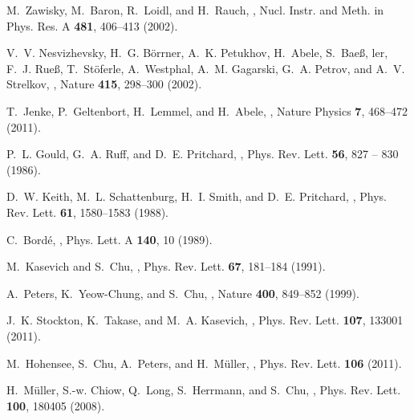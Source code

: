 \documentclass[12pt]{article}
\begin{document}
\begin{thebibliography}{100}
M.~Zawisky, M.~Baron, R.~Loidl, and H.~Rauch,
,
\newblock Nucl. Instr. and Meth. in Phys. Res. A {\bf 481}, 406–413 (2002).

V.~V. Nesvizhevsky, H.~G. Börrner, A.~K. Petukhov, H.~Abele, S.~Bae\ss, ler,
  F.~J. Rue\ss, T.~Stöferle, A.~Westphal, A.~M. Gagarski, G.~A. Petrov, and
  A.~V. Strelkov,
,
\newblock Nature {\bf 415}, 298--300 (2002).

T.~Jenke, P.~Geltenbort, H.~Lemmel, and H.~Abele,
,
\newblock Nature Physics {\bf 7}, 468–472 (2011).

P.~L. Gould, G.~A. Ruff, and D.~E. Pritchard,
,
\newblock Phys. Rev. Lett. {\bf 56}, 827 -- 830 (1986).

D.~W. Keith, M.~L. Schattenburg, H.~I. Smith, and D.~E. Pritchard,
,
\newblock Phys. Rev. Lett. {\bf 61}, 1580--1583 (1988).

C.~Bordé,
,
\newblock Phys. Lett. A {\bf 140}, 10 (1989).

M.~Kasevich and S.~Chu,
,
\newblock Phys. Rev. Lett. {\bf 67}, 181--184 (1991).

A.~Peters, K.~Yeow-Chung, and S.~Chu,
,
\newblock Nature {\bf 400}, 849--852 (1999).

J.~K. Stockton, K.~Takase, and M.~A. Kasevich,
,
\newblock Phys. Rev. Lett. {\bf 107}, 133001 (2011).

M.~Hohensee, S.~Chu, A.~Peters, and H.~Müller,
,
\newblock Phys. Rev. Lett. {\bf 106} (2011).

H.~Müller, S.-w. Chiow, Q.~Long, S.~Herrmann, and S.~Chu,
,
\newblock Phys. Rev. Lett. {\bf 100}, 180405 (2008).


\end{thebibliography}
\end{document}
